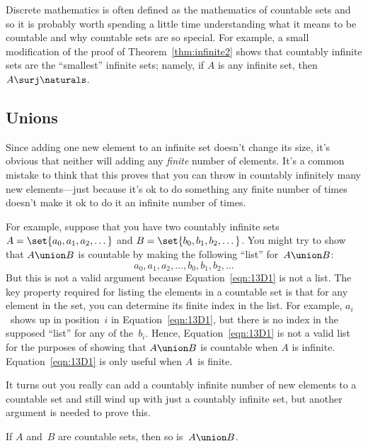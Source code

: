 Discrete mathematics is often defined as the mathematics of countable
sets and so it is probably worth spending a little time understanding
what it means to be countable and why countable sets are so special.
For example, a small modification
of the proof of Theorem~\ref{thm:infinite2} shows that countably
infinite sets are the ``smallest'' infinite sets; namely, if $A$ is
any infinite set, then $A \surj \naturals$.

\subsection{Unions}

Since adding one new element to an infinite set doesn't change its
size, it's obvious that neither will adding any \emph{finite} number
of elements.  It's a common mistake to think that this proves that you
can throw in countably infinitely many new elements---just because
it's ok to do something any finite number of times doesn't make it ok
to do it an infinite number of times.

For example, suppose that you have two countably infinite sets $A =
\set{a_0, a_1, a_2, \dots}$ and $B = \set{b_0, b_1, b_2, \dots}$.  You
might try to show that $A \union B$ is countable by making the
following ``list'' for~$A \union B$:
\begin{equation}\label{eqn:13D1}
    a_0, a_1, a_2, \dots, b_0, b_1, b_2, \dots
\end{equation}
But this is not a valid argument because Equation~\ref{eqn:13D1} is
not a list.  The key property required for listing the elements
in a countable set is that for any element in the set, you can
determine its finite index in the list.  For example, $a_i$~shows up
in position~$i$ in Equation~\ref{eqn:13D1}, but there is no index in
the supposed ``list'' for any of the~$b_i$.  Hence,
Equation~\ref{eqn:13D1} is not a valid list for the purposes  of
showing that $A \union B$ is countable when $A$ is infinite.
Equation~\ref{eqn:13D1} is only useful when $A$~is finite.

It turns out you really can add a countably infinite number of new
elements to a countable set and still wind up with just a countably
infinite set, but another argument is needed to prove this.

\begin{theorem}\label{thm:countable_union}
If $A$ and~$B$ are countable sets, then so is~$A \union B$.
\end{theorem}

